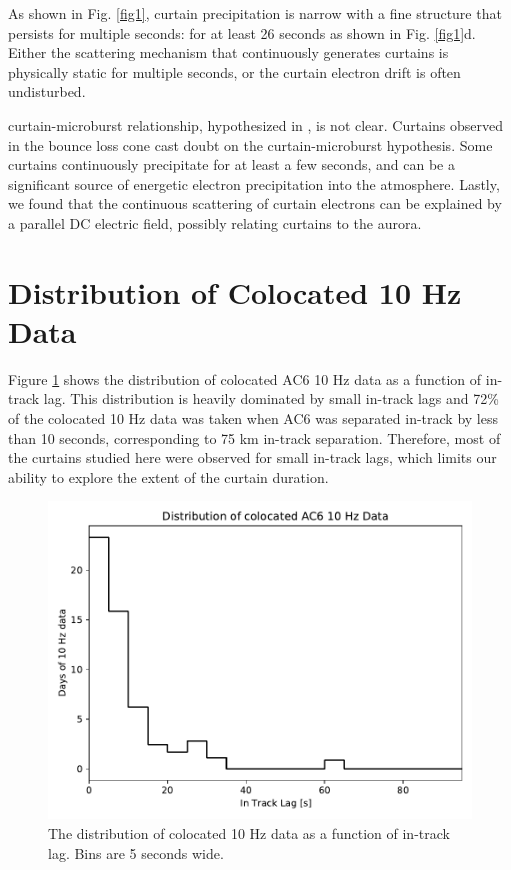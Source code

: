 \documentclass[draft]{agujournal2019}
\begin{document}
As shown in Fig. \ref{fig1}, curtain precipitation is narrow with a fine structure that persists for multiple seconds: for at least 26 seconds as shown in Fig. \ref{fig1}d. Either the scattering mechanism that continuously generates curtains is physically static for multiple seconds, or the curtain electron drift is often undisturbed. 

 curtain-microburst relationship, hypothesized in , is not clear. Curtains observed in the bounce loss cone cast doubt on the curtain-microburst hypothesis. Some curtains continuously precipitate for at least a few seconds, and can be a significant source of energetic electron precipitation into the atmosphere. Lastly, we found that the continuous scattering of curtain electrons can be explained by a parallel DC electric field, possibly relating curtains to the aurora.

\appendix

\section{Distribution of Colocated 10 Hz Data}
Figure \ref{a_10Hz_dist} shows the distribution of colocated AC6 10 Hz data as a function of in-track lag. This distribution is heavily dominated by small in-track lags and 72\% of the colocated 10 Hz data was taken when AC6 was separated in-track by less than 10 seconds, corresponding to 75 km in-track separation. Therefore, most of the curtains studied here were observed for small in-track lags, which limits our ability to explore the extent of the curtain duration.

\begin{figure}
\includegraphics[width=\textwidth]{a_10hz_dist.pdf}
\caption{The distribution of colocated 10 Hz data as a function of in-track lag. Bins are 5 seconds wide.}
\label{a_10Hz_dist}
\end{figure}
\end{document}
